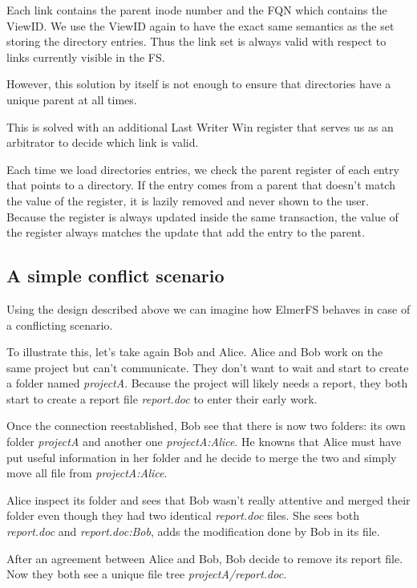 \documentclass[sigconf,anonymous,10pt]{acmart}
\begin{document}
Each link contains the parent inode number and the FQN which contains
the ViewID.
We use the ViewID again to have the exact same semantics as the set storing
the directory entries. Thus the link set is always valid with respect to
links currently visible in the FS.

However, this solution by itself is not enough to ensure that directories have a
unique parent at all times.

This is solved with an additional Last Writer Win register that serves us as
an arbitrator to decide which link is valid.

Each time we load directories  entries, we check the parent register of each
entry that points to a directory. If the entry comes from a parent that doesn’t
match the value of the register, it is lazily removed and never shown to the user.
Because the register is always updated inside the same transaction, the
value of the register always matches the update that add the entry
to the parent.

\subsection{A simple conflict scenario}

Using the design described above we can imagine how ElmerFS behaves in case
of a conflicting scenario.

To illustrate this, let's take again Bob and Alice. Alice and Bob work
on the same project but can't communicate. They don't want to wait and start to create a
folder named \textit{projectA}. Because the project will likely needs a report,
they both start to create a report file \textit{report.doc} to enter their early work.

Once the connection reestablished, Bob see that there is now two folders:
its own folder \textit{projectA} and another one \textit{projectA:Alice}.
He knowns that Alice must have put useful information in her folder and he
decide to merge the two and simply move all file from \textit{projectA:Alice}.

Alice inspect its folder and sees that Bob wasn't really attentive
and merged their folder even though they had two identical
\textit{report.doc} files.
She sees both \textit{report.doc} and \textit{report.doc:Bob},
adds the modification done by Bob in its file.

After an agreement between Alice and Bob, Bob decide to remove its report file.
Now they both see a unique file tree \textit{projectA/report.doc}.
\end{document}
